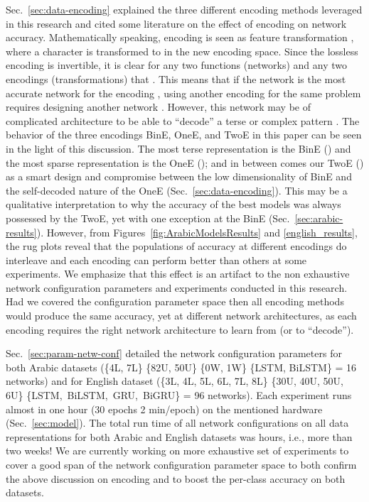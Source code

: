 \documentclass[journal,10pt,twocolumns,letter]{IEEEtran}
\begin{document}
Sec.~\ref{sec:data-encoding} explained the three different encoding methods leveraged in this
research and cited some literature on the effect of encoding on network accuracy. Mathematically
speaking, encoding is seen as feature transformation , where a character  is
transformed to  in the new encoding space. Since the lossless encoding is
invertible, it is clear for any two functions (networks) and any two encodings (transformations)
that
. This means that if the network  is the most accurate
network for the encoding , using another encoding  for the same
problem requires designing another network
. However, this network may be of
complicated architecture to be able to ``decode'' a terse or complex pattern . The
behavior of the three encodings BinE, OneE, and TwoE in this paper can be seen in the light of this
discussion. The most terse representation is the BinE () and the most sparse representation is
the OneE (); and in between comes our TwoE () as a smart design and compromise between
the low dimensionality of BinE and the self-decoded nature of the OneE
(Sec.~\ref{sec:data-encoding}). This may be a qualitative interpretation to why the accuracy of the
best models was always possessed by the TwoE, yet with one exception at the BinE
(Sec.~\ref{sec:arabic-results}). However, from Figures~\ref{fig:ArabicModelsResults} and
\ref{english_results}, the rug plots reveal that the populations of accuracy at different
encodings do interleave and each encoding can perform better than others at some experiments. We
emphasize that this effect is an artifact to the non exhaustive network configuration parameters and
experiments conducted in this research. Had we covered the configuration parameter space then all
encoding methods would produce the same accuracy, yet at different network architectures, as each
encoding requires the right network architecture to learn from (or to ``decode'').


Sec.~\ref{sec:param-netw-conf} detailed the network configuration parameters for both Arabic
datasets (\{4L, 7L\}  \{82U, 50U\}  \{0W, 1W\}  \{LSTM, BiLSTM\} = 16
networks) and for English dataset (\{3L, 4L, 5L, 6L, 7L, 8L\}  \{30U, 40U, 50U, 6U\}
 \{LSTM,\ BiLSTM,\ GRU,\ BiGRU\} = 96 networks). Each experiment runs almost in one hour (30
epochs  2 min/epoch) on the mentioned hardware (Sec.~\ref{sec:model}). The total run time of
all network configurations on all data representations for both Arabic and English datasets was
 hours, i.e., more than two weeks! We are currently working on more
exhaustive set of experiments to cover a good span of the network configuration parameter space to
both confirm the above discussion on encoding and to boost the per-class accuracy on both datasets.
\end{document}
